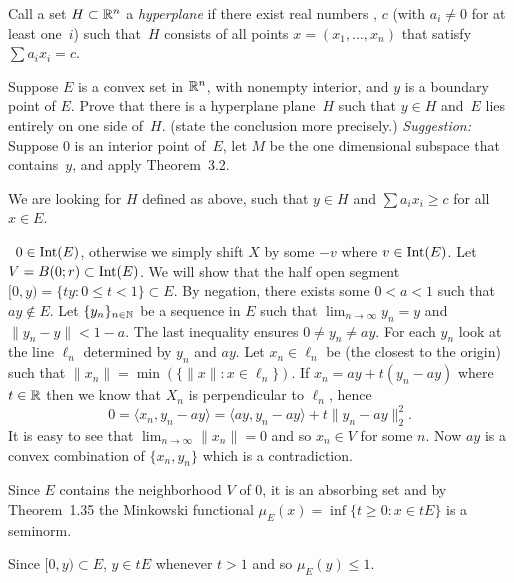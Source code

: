 \begin{enumerate}

\begin{excopy}
Call a set \(H\subset \mathbb{R}^n\) a
\emph{hyperplane} if there exist real numbers , $c$
(with \(a_i\neq 0\) for at least one~$i$) such that~$H$ consists of all points
\(x=(x_1,\ldots,x_n)\) that satisfy \(\sum a_ix_i = c\).

Suppose $E$ is a convex set in \(\mathbb{R}^n\), with nonempty interior,
and $y$ is a boundary point of $E$. Prove that there is a hyperplane plane~$H$
such that \(y\in H\) and~$E$ lies entirely on one side of~$H$.
(state the conclusion more precisely.)
\emph{Suggestion:} Suppose $0$ is an interior point of~$E$,
let $M$ be the one dimensional subspace that contains~$y$, and apply
Theorem~3.2.
\end{excopy}

We are looking for $H$ defined as above, such that
\(y\in H\) and \(\sum a_ix_i \geq c\) for all \(x\in E\).

\Wlogy\ \(0\in \mathop{\rm Int}\nolimits(E)\), otherwise we simply shift $X$ by some \(-v\)
where \(v\in\mathop{\rm Int}\nolimits(E)\).
Let \(V=B(0;r)\subset \mathop{\rm Int}\nolimits(E)\).
We will show that the half open segment \([0,y) = \{ty: 0\leq t<1\} \subset E\).
By negation, there exists
some \(0 < a < 1\) such that \(ay \notin E\).
Let \(\{y_n\}_{n\in\mathbb{N}}\) be a sequence in $E$ such that
\(\lim_{n\to\infty} y_n = y\) and \(\|y_n - y\| < 1-a\).
The last inequality ensures \(0\neq y_n \neq ay\).
For each \(y_n\) look at the line \(\ell_n\) determined by \(y_n\) and \(ay\).
Let \(x_n\in \ell_n\) be (the closest to the origin) such that
\(\|x_n\| = \min(\{\|x\|: x\in\ell_n\})\).
If \(x_n = ay + t(y_n - ay)\) where \(t\in\mathbb{R}\) then we know that
\(X_n\) is perpendicular to \(\ell_n\), hence
\begin{equation*}
0 = \langle x_n, y_n-ay\rangle
  = \langle ay, y_n-ay\rangle + t \|y_n -ay\|_2^2.
\end{equation*}
It is easy to see that \(\lim_{n\to\infty} \|x_n\| = 0\)
and so \(x_n \in V\) for some $n$. Now \(ay\) is a convex combination
of \(\{x_n,y_n\}\) which is a contradiction.

Since $E$ contains the neighborhood $V$ of $0$, it is an absorbing set and
by Theorem~1.35 the
Minkowski functional \(\mu_E(x) = \inf\{t\geq 0: x\in tE\}\)
is a seminorm.

Since \([0,y)\subset E\), \(y\in tE\) whenever \(t>1\)
and so \(\mu_E(y)\leq 1\).


\end{enumerate}
